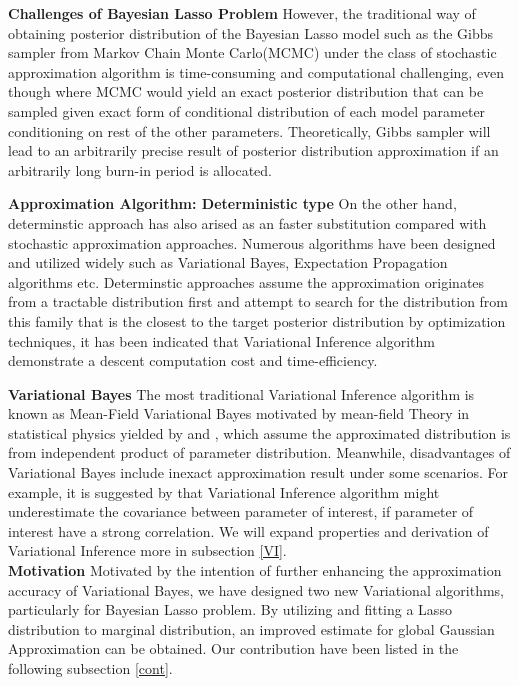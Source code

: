 \textbf{Challenges of Bayesian Lasso Problem}
However, the traditional way of obtaining posterior distribution of the Bayesian Lasso model such as the  Gibbs sampler from Markov Chain Monte Carlo(MCMC) under the class of stochastic approximation algorithm is time-consuming and computational challenging, even though where MCMC would yield an exact posterior distribution that can be sampled given exact form of conditional distribution of each model parameter conditioning on rest of the other parameters. Theoretically, Gibbs sampler will lead to an arbitrarily precise result of posterior distribution approximation if an arbitrarily long burn-in period is allocated. 


\textbf{Approximation Algorithm: Deterministic type}
On the other hand, determinstic approach has also arised as an faster substitution compared with stochastic approximation approaches. Numerous algorithms have been designed and utilized widely such as Variational Bayes, Expectation Propagation algorithms etc. Determinstic approaches assume the approximation originates from a tractable distribution first and attempt to search for the distribution from this family that is the closest to the target posterior distribution by optimization techniques, it has been indicated that Variational Inference algorithm demonstrate a descent computation cost and time-efficiency. 

\textbf{Variational Bayes}
The most traditional Variational Inference algorithm is known as Mean-Field Variational Bayes motivated by mean-field Theory in statistical physics yielded by 
\cite{jordan_ghahramani_jaakkola_saul_1998} and \cite{attias_1999}, which assume the approximated distribution is from independent product of parameter distribution.
Meanwhile, disadvantages of Variational Bayes include inexact approximation result under some scenarios. For example, it is suggested by \cite{bishop_2006} that Variational Inference algorithm might underestimate the covariance between parameter of interest, if parameter of interest have a strong correlation. We will expand properties and derivation of Variational Inference more in subsection \ref{VI}.\\

\textbf{Motivation}
Motivated by the intention of further enhancing the approximation accuracy of Variational Bayes, we have designed two new Variational algorithms, particularly for Bayesian Lasso problem. By utilizing and fitting a Lasso distribution to marginal distribution, an improved estimate for global Gaussian Approximation can be obtained. Our contribution have been listed in the following subsection \ref{cont}.\\



